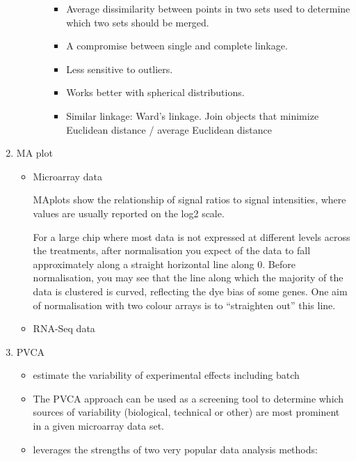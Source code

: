\documentclass[
]{book}
\begin{document}
\begin{enumerate}
\begin{itemize}
\begin{itemize}
      \begin{itemize}
      \item
        Average dissimilarity between points in two sets used to determine which two sets should be merged.
      \item
        A compromise between single and complete linkage.
      \item
        Less sensitive to outliers.
      \item
        Works better with spherical distributions.
      \item
        Similar linkage: Ward's linkage. Join objects that minimize Euclidean distance / average Euclidean distance
      \end{itemize}
    \end{itemize}
  \end{itemize}
\item
  MA plot

  \begin{itemize}
  \item
    Microarray data

    MAplots show the relationship of signal ratios to signal intensities, where values are usually reported on the log2 scale.

    For a large chip where most data is not expressed at different levels across the treatments, after normalisation you expect of the data to fall approximately along a straight horizontal line along 0. Before normalisation, you may see that the line along which the majority of the data is clustered is curved, reflecting the dye bias of some genes. One aim of normalisation with two colour arrays is to ``straighten out'' this line.
  \item
    RNA-Seq data
  \end{itemize}
\item
  PVCA

  \begin{itemize}
  \item
    estimate the variability of experimental effects including batch
  \item
    The PVCA approach can be used as a screening tool to determine which sources of variability (biological, technical or other) are most prominent in a given microarray data set.
  \item
    leverages the strengths of two very popular data analysis methods:


\end{itemize}
\end{enumerate}
\end{document}
